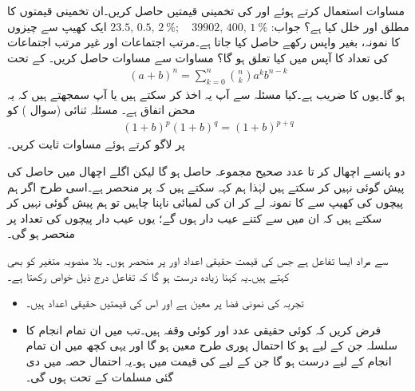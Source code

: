 \quad
مساوات  استعمال کرتے ہوئے  اور  کی تخمینی قیمتیں حاصل کریں۔ان تخمینی قیمتوں کا مطلق اور  خلل کیا ہے؟
جواب:\quad
$23.5,\,0.5,\,\SI{2}{\percent};\quad \num{39902},\,400,\,\SI{1}{\percent}$
\quad
ایک کھیپ سے  چیزوں کا نمونہ، بغیر واپس رکھے حاصل کیا جاتا ہے۔مرتب اجتماعات اور غیر مرتب اجتماعات کی تعداد کا آپس میں کیا تعلق ہو گا؟
\quad
مساوات  سے مساوات  حاصل کریں۔
\quad {} \quad
{} کے تحت
\begin{align*}
(a+b)^n=\sum_{k=0}^{n}\binom{n}{k}a^kb^{n-k}
\end{align*}
ہو گا۔یوں  کا  ضریب   ہے۔کیا مسئلہ  سے آپ یہ اخذ کر سکتے ہیں یا آپ سمجھتے ہیں کہ یہ محض اتفاق ہے۔
\quad
مسئلہ ثنائی (سوال ) کو
\begin{align*}
(1+b)^p(1+b)^q=(1+b)^{p+q}
\end{align*}
پر لاگو کرتے ہوئے مساوات  ثابت کریں۔

دو پانسے اچھال کر  تا  عدد صحیح مجموعہ   حاصل ہو گا لیکن اگلے اچھال  میں حاصل   کی پیش گوئی نہیں کر سکتے ہیں لہٰذا ہم کہہ سکتے ہیں کہ   پر منحصر ہے۔اسی طرح اگر ہم پیچوں کی کھیپ سے  کا نمونہ لے کر ان کی لمبائی ناپنا چاہیں تو ہم پیش گوئی نہیں کر سکتے ہیں کہ ان میں سے کتنے عیب دار ہوں گے؛ یوں عیب دار پیچوں کی تعداد   پر منحصر ہو گی۔

   سے مراد ایسا تفاعل ہے جس کی قیمت حقیقی اعداد اور   پر منحصر ہوں۔ بلا منصوبہ متغیر کو  بھی کہتے ہیں۔یہ کہنا زیادہ درست ہو گا کہ تفاعل  درج ذیل خواص رکھتا ہے۔
\begin{itemize}
\item
تجربہ کی نمونی فضا  پر  معین ہے اور اس کی قیمتیں حقیقی اعداد ہیں۔
\item
فرض کریں کہ  کوئی حقیقی عدد اور  کوئی وقفہ ہیں۔تب  میں ان تمام انجام کا سلسلہ جن کے لیے  ہو کا احتمال پوری طرح معین ہو گا اور یہی کچھ  میں ان تمام انجام کے لیے درست ہو گا جن کے لیے  کی قیمت  میں ہو۔یہ احتمال حصہ  میں دی گئی مسلمات کے تحت ہوں گی۔
\end{itemize}

